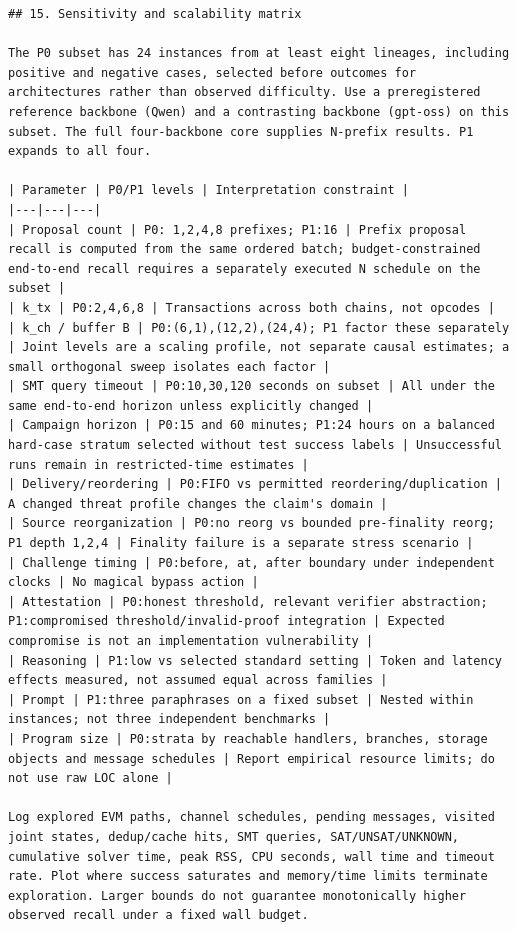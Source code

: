 \documentclass[11pt,a4paper]{article}
\begin{document}
\begin{verbatim}
## 15. Sensitivity and scalability matrix

The P0 subset has 24 instances from at least eight lineages, including positive and negative cases, selected before outcomes for architectures rather than observed difficulty. Use a preregistered reference backbone (Qwen) and a contrasting backbone (gpt-oss) on this subset. The full four-backbone core supplies N-prefix results. P1 expands to all four.

| Parameter | P0/P1 levels | Interpretation constraint |
|---|---|---|
| Proposal count | P0: 1,2,4,8 prefixes; P1:16 | Prefix proposal recall is computed from the same ordered batch; budget-constrained end-to-end recall requires a separately executed N schedule on the subset |
| k_tx | P0:2,4,6,8 | Transactions across both chains, not opcodes |
| k_ch / buffer B | P0:(6,1),(12,2),(24,4); P1 factor these separately | Joint levels are a scaling profile, not separate causal estimates; a small orthogonal sweep isolates each factor |
| SMT query timeout | P0:10,30,120 seconds on subset | All under the same end-to-end horizon unless explicitly changed |
| Campaign horizon | P0:15 and 60 minutes; P1:24 hours on a balanced hard-case stratum selected without test success labels | Unsuccessful runs remain in restricted-time estimates |
| Delivery/reordering | P0:FIFO vs permitted reordering/duplication | A changed threat profile changes the claim's domain |
| Source reorganization | P0:no reorg vs bounded pre-finality reorg; P1 depth 1,2,4 | Finality failure is a separate stress scenario |
| Challenge timing | P0:before, at, after boundary under independent clocks | No magical bypass action |
| Attestation | P0:honest threshold, relevant verifier abstraction; P1:compromised threshold/invalid-proof integration | Expected compromise is not an implementation vulnerability |
| Reasoning | P1:low vs selected standard setting | Token and latency effects measured, not assumed equal across families |
| Prompt | P1:three paraphrases on a fixed subset | Nested within instances; not three independent benchmarks |
| Program size | P0:strata by reachable handlers, branches, storage objects and message schedules | Report empirical resource limits; do not use raw LOC alone |

Log explored EVM paths, channel schedules, pending messages, visited joint states, dedup/cache hits, SMT queries, SAT/UNSAT/UNKNOWN, cumulative solver time, peak RSS, CPU seconds, wall time and timeout rate. Plot where success saturates and memory/time limits terminate exploration. Larger bounds do not guarantee monotonically higher observed recall under a fixed wall budget.


\end{verbatim}
\end{document}
